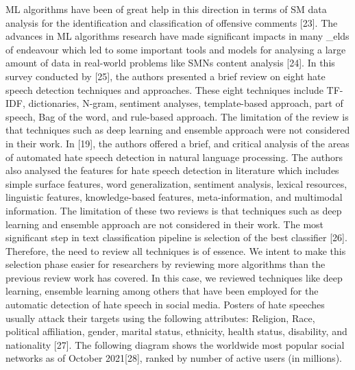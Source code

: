 \documentclass{letter}
\begin{document}
\begin{multicols}{2}
\begin{normalsize}
{ML algorithms have been of great help in this 
direction in terms of SM data analysis for the 
identification and classification of offensive comments 
[23]. The advances in ML algorithms research have 
made significant impacts in many \_elds of endeavour 
which led to some important tools and models for
analysing a large amount of data in real-world 
problems like SMNs content analysis [24]. In this survey 
conducted by [25], the authors presented a brief review 
on eight hate speech detection techniques and 
approaches. These eight techniques include TF-IDF, 
dictionaries, N-gram, sentiment analyses, 
template-based approach, part of speech, Bag of the 
word, and rule-based approach. The limitation of the 
review is that techniques such as deep learning and 
ensemble approach were not considered in their work. 
In [19], the authors offered a brief, and critical analysis 
of the areas of automated hate speech detection in 
natural language processing. The authors also analysed 
the features for hate speech detection in literature which 
includes simple surface features, word generalization, 
sentiment analysis, lexical resources, linguistic features, 
knowledge-based features, meta-information, and 
multimodal information. The limitation of these two 
reviews is that techniques such as deep learning and 
ensemble approach are not considered in their work. 
The most significant step in text classification pipeline is 
selection of the best classifier [26]. Therefore, the need to 
review all techniques is of essence. We intent to make 
this selection phase easier for researchers by reviewing 
more algorithms than the previous review work has 
covered. In this case, we reviewed techniques like deep 
learning, ensemble learning among others that have 
been employed for the automatic detection of hate 
speech in social media. Posters of hate speeches usually 
attack their targets using the following attributes: 
Religion, Race, political affiliation, gender, marital 
status, ethnicity, health status, disability, and 
nationality [27]. The following diagram shows the 
worldwide most popular social networks as of October 
2021[28], ranked by number of active users (in millions).}
\end{normalsize}\\ \\


\end{multicols}
\end{document}

